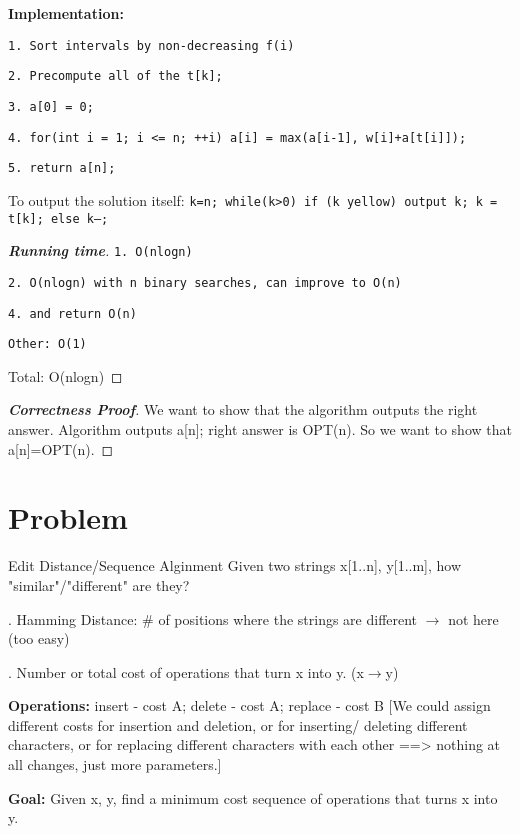 \documentclass[openany]{article}
\begin{document}
\begin{solution*}{}
    \textbf{Implementation:}

    \qquad \texttt{1. Sort intervals by non-decreasing f(i)}
    
    \qquad \texttt{2. Precompute all of the t[k];}
    
    \qquad \texttt{3. a[0] = 0;}
    
    \qquad \texttt{4. for(int i = 1; i <= n; ++i) a[i] = max(a[i-1], w[i]+a[t[i]]);}
    
    \qquad \texttt{5. return a[n];}

    To output the solution itself:
    \texttt{k=n; while(k>0) if (k yellow) {output k; k = t[k];} else k--;}
    

    
\end{solution*}

    \begin{proof}[\textbf{Running time}]{}
    \renewcommand{\qedsymbol}{}
    
        \qquad \texttt{1. O(nlogn)}
        
        \qquad \texttt{2. O(nlogn) with n binary searches, can improve to O(n)}
        
        \qquad \texttt{4. and return O(n)}
        
        \qquad \texttt{Other: O(1)}

        Total: O(nlogn)
    \end{proof}

    \begin{proof}[\textbf{Correctness Proof}]{}
    \renewcommand{\qedsymbol}{}
        We want to show that the algorithm outputs the right answer. Algorithm outputs a[n]; right answer is OPT(n). So we want to show that a[n]=OPT(n).

        
    \end{proof}



\section*{Problem}
\begin{problem*}{Edit Distance/Sequence Alginment}
    Given two strings x[1..n], y[1..m], how "similar"/"different" are they?

    . Hamming Distance: $\#$ of positions where the strings are different $\rightarrow$ not here (too easy)
    
    . Number or total cost of operations that turn x into y. (x$\rightarrow$y)
    
    \textbf{Operations:} insert - cost A; delete - cost A; replace - cost B [We could assign different costs for insertion and deletion, or for inserting/ deleting different characters, or for replacing different characters with
each other ==> nothing at all changes, just more parameters.]

    \textbf{Goal:} Given x, y, find a minimum cost sequence of operations that turns x into y.
\end{problem*}
\end{document}

